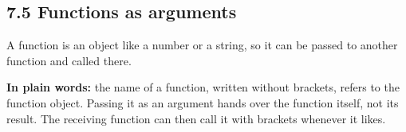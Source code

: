 \documentclass[11pt]{article}
\begin{document}
\begin{keepsection}
\section{7.5 Functions as arguments}

A function is an object like a number or a string, so it can be passed to another function and called there.

\begin{plainbox}\textbf{In plain words:} the name of a function, written without brackets, refers to the function object. Passing it as an argument hands over the function itself, not its result. The receiving function can then call it with brackets whenever it likes.\end{plainbox}


\end{keepsection}
\end{document}
